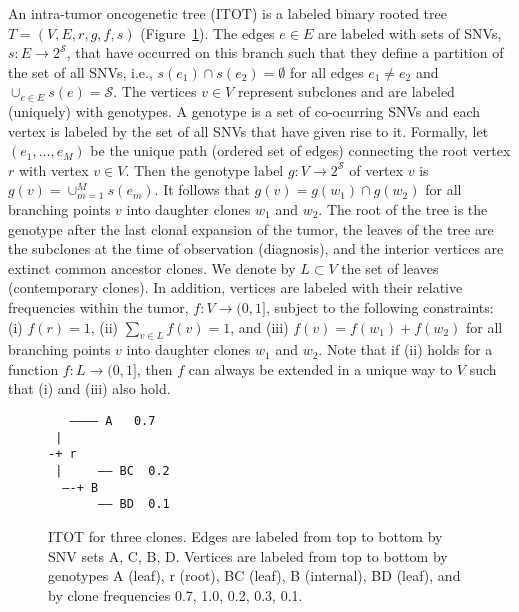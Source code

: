 \documentclass[12pt,a4paper]{amsart}
\newcommand{\cS}{\mathcal{S}}
\begin{document}
An intra-tumor oncogenetic tree (ITOT) is a labeled binary rooted tree $T = (V, E, r, g, f, s)$ (Figure~\ref{fig:tree}).
The edges $e \in E$ are labeled with sets of SNVs, $s : E \to 2^{\cS}$, that have occurred on this branch
such that they define a partition of the set of all SNVs, i.e., $s(e_1) \cap s(e_2) = \emptyset$ for all edges
$e_1 \not= e_2$ and $\cup_{e \in E} s(e) = \cS$.  
The vertices $v \in V$ represent subclones and are labeled (uniquely) with genotypes. A genotype is a set of co-ocurring SNVs and each vertex is labeled by the set of all SNVs that have given rise to it. Formally, let $(e_1, \dots, e_M)$ be the unique path (ordered set of edges) connecting the root vertex $r$ with vertex $v \in V$. Then the genotype label $g : V \to 2^{\cS}$ of vertex $v$ is $g(v) = \cup_{m=1}^M s(e_m)$.
It follows that $g(v) = g(w_1) \cap g(w_2)$ for all branching points $v$ into daughter clones $w_1$ and $w_2$. 
The root of the tree is the genotype after the last clonal expansion of the tumor, the leaves of the tree are the subclones at the time of observation (diagnosis), and the interior vertices are extinct common ancestor clones. We denote by $L \subset V$ the set of leaves (contemporary clones). 
In addition, vertices are labeled with their relative frequencies within the tumor, $f : V \to (0,1]$,
subject to the following constraints: (i) $f(r) = 1$, (ii) $\sum_{v \in L} f(v) = 1$, and
(iii) $f(v) = f(w_1) + f(w_2)$ for all branching points $v$ into daughter clones $w_1$ and $w_2$.
Note that if (ii) holds for a function $f : L \to (0,1]$, then $f$ can always be extended in a unique way to $V$ 
such that (i) and (iii) also hold. 


\begin{figure}[t]
\flushleft
{\tt
~~----------- A ~~0.7\\
~|\\
-+ r\\        
~|~~~~~------ BC ~0.2\\
~~----+ B\\
~~~~~~~------ BD ~0.1\\
}
\caption{\label{fig:tree}
ITOT for three clones. Edges are labeled from top to bottom by
SNV sets A, C, B, D.  Vertices are labeled from top to bottom by
genotypes A (leaf), r (root), BC (leaf), B (internal), BD (leaf),
and by clone frequencies 0.7, 1.0, 0.2, 0.3, 0.1.
}
\end{figure}
\end{document}
